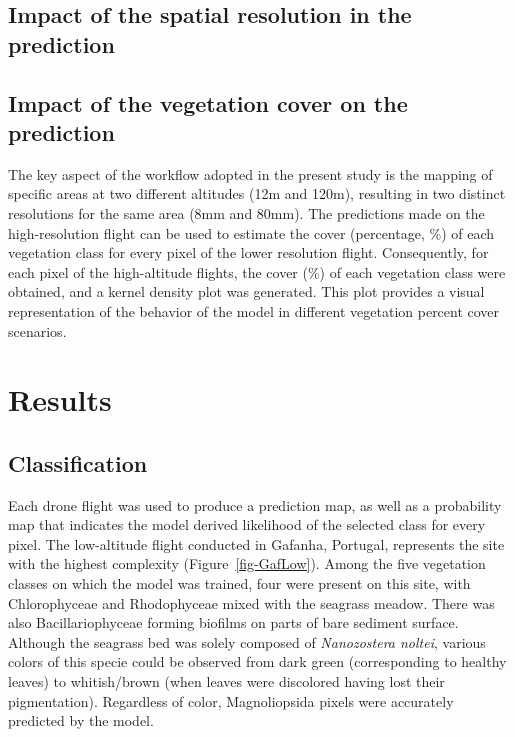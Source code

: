 \documentclass[
  number]{elsarticle}
\begin{document}
\subsection{Impact of the spatial resolution in the
prediction}\label{impact-of-the-spatial-resolution-in-the-prediction}

\subsection{Impact of the vegetation cover on the
prediction}\label{impact-of-the-vegetation-cover-on-the-prediction}

The key aspect of the workflow adopted in the present study is the
mapping of specific areas at two different altitudes (12m and 120m),
resulting in two distinct resolutions for the same area (8mm and 80mm).
The predictions made on the high-resolution flight can be used to
estimate the cover (percentage, \%) of each vegetation class for every
pixel of the lower resolution flight. Consequently, for each pixel of
the high-altitude flights, the cover (\%) of each vegetation class were
obtained, and a kernel density plot was generated. This plot provides a
visual representation of the behavior of the model in different
vegetation percent cover scenarios.

\section{Results}\label{results}

\subsection{Classification}\label{classification}

Each drone flight was used to produce a prediction map, as well as a
probability map that indicates the model derived likelihood of the
selected class for every pixel. The low-altitude flight conducted in
Gafanha, Portugal, represents the site with the highest complexity
(Figure~\ref{fig-GafLow}). Among the five vegetation classes on which
the model was trained, four were present on this site, with
Chlorophyceae and Rhodophyceae mixed with the seagrass meadow. There was
also Bacillariophyceae forming biofilms on parts of bare sediment
surface. Although the seagrass bed was solely composed of
\emph{Nanozostera noltei}, various colors of this specie could be
observed from dark green (corresponding to healthy leaves) to
whitish/brown (when leaves were discolored having lost their
pigmentation). Regardless of color, Magnoliopsida pixels were accurately
predicted by the model.
\end{document}
